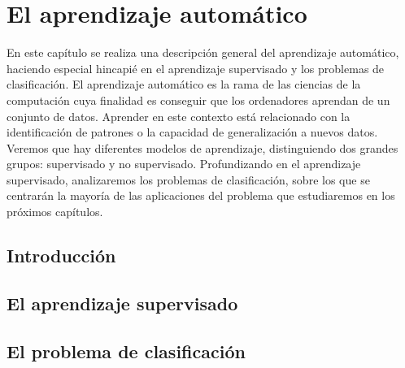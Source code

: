 \chapter{El aprendizaje automático}

En este capítulo se realiza una descripción general del aprendizaje automático, haciendo especial hincapié en el aprendizaje supervisado y los problemas de clasificación. El aprendizaje automático es la rama de las ciencias de la computación cuya finalidad es conseguir que los ordenadores aprendan de un conjunto de datos. Aprender en este contexto está relacionado con la identificación de patrones o la capacidad de generalización a nuevos datos. Veremos que hay diferentes modelos de aprendizaje, distinguiendo dos grandes grupos: supervisado y no supervisado. Profundizando en el aprendizaje supervisado, analizaremos los problemas de clasificación, sobre los que se centrarán la mayoría de las aplicaciones del problema que estudiaremos en los próximos capítulos.

\section{Introducción}



\section{El aprendizaje supervisado}



\section{El problema de clasificación}